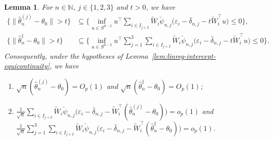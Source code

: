 \documentclass[a4paper]{article}
\newcommand{\N}{\mathbb{N}}
\newcommand{\norm}[1]{\|{#1}\|}
\newtheorem{lemma}[theorem]{Lemma}
\theoremstyle{definition}
\begin{document}
\begin{lemma}
\label{lem:linreg-intercept-consistency}
For $n \in \N$, $j \in \{1,2,3\}$ and $t > 0$, we have
\begin{align}
\label{eq:linreg-intercept-sphere-j}
\bigl\{\norm{\hat{\theta}_n^{(j)} - \theta_0} > t\bigr\} &\subseteq \biggl\{\inf_{u \in S^{d-2}}u^\top \sum_{i \in I_{j+2}} \tilde{W}_i\check{\psi}_{n,j}\bigl(\varepsilon_i - \bar{\delta}_{n,j} - t\tilde{W}_i^\top u\bigr) \leq 0\biggr\}, \\
\label{eq:linreg-intercept-sphere}
\bigl\{\norm{\hat{\theta}_n^\ddagger - \theta_0} > t\bigr\} &\subseteq \biggl\{\inf_{u \in S^{d-2}}u^\top \sum_{j=1}^3 \sum_{i \in I_{j+2}} \tilde{W}_i\check{\psi}_{n,j}\bigl(\varepsilon_i - \bar{\delta}_{n,j} - t\tilde{W}_i^\top u\bigr) \leq 0\biggr\}.
\end{align}
Consequently, under the hypotheses of Lemma~\ref{lem:linreg-intercept-equicontinuity}, we have
\begin{enumerate}[label=(\alph*)]
\item $\sqrt{n}(\hat{\theta}_n^{(j)} - \theta_0) = O_p(1)$ and $\sqrt{n}(\hat{\theta}_n^\ddagger - \theta_0) = O_p(1)$;
\item $\displaystyle\frac{1}{\sqrt{n}}\sum_{i \in I_{j+2}}\!\!\tilde{W}_i\check{\psi}_{n,j}\bigl(\varepsilon_i - \bar{\delta}_{n,j} - \tilde{W}_i^\top(\hat{\theta}_n^{(j)} - \theta_0)\bigr) = o_p(1)$ and \\
$\displaystyle\frac{1}{\sqrt{n}}\sum_{j=1}^3 \sum_{i \in I_{j+2}}\!\!\tilde{W}_i\check{\psi}_{n,j}\bigl(\varepsilon_i - \bar{\delta}_{n,j} - \tilde{W}_i^\top(\hat{\theta}_n^\ddagger - \theta_0)\bigr) = o_p(1)$.
\end{enumerate}
\end{lemma}
\end{document}

